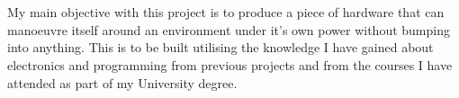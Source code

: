\\\\My main objective with this project is to produce a piece of hardware that can manoeuvre itself around an environment under it's own power without bumping into anything.  This is to be built utilising the knowledge I have gained about electronics and programming from previous projects and from the courses I have attended as part of my University degree.

